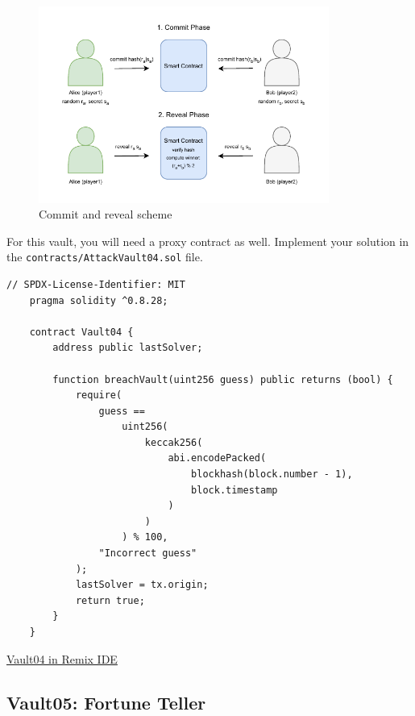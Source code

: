 \documentclass[12pt]{article}
\begin{document}
\begin{figure}[H]
    \centering
    \includegraphics[width=0.85\textwidth]{commit-reveal.pdf}
    \caption{Commit and reveal scheme}
    \label{fig:commit-reveal}
\end{figure}

\medskip
\noindent
For this vault, you will need a proxy contract as well. Implement your solution in the \texttt{contracts/AttackVault04.sol} file.

\begin{lstlisting}[language=Solidity]
    // SPDX-License-Identifier: MIT
    pragma solidity ^0.8.28;
    
    contract Vault04 {
        address public lastSolver;
    
        function breachVault(uint256 guess) public returns (bool) {
            require(
                guess ==
                    uint256(
                        keccak256(
                            abi.encodePacked(
                                blockhash(block.number - 1),
                                block.timestamp
                            )
                        )
                    ) % 100,
                "Incorrect guess"
            );
            lastSolver = tx.origin;
            return true;
        }
    }
\end{lstlisting}

\medskip
\noindent
\href{https://remix.ethereum.org/?#activate=solidity&url=https://github.com/radovluk/unbreakable-vault/contracts/Vault04.sol&lang=en&optimize=false&runs=200&evmVersion=null&version=soljson-v0.8.28+commit.7893614a.js}{Vault04 in Remix IDE}

\subsection*{Vault05: Fortune Teller}
\end{document}

